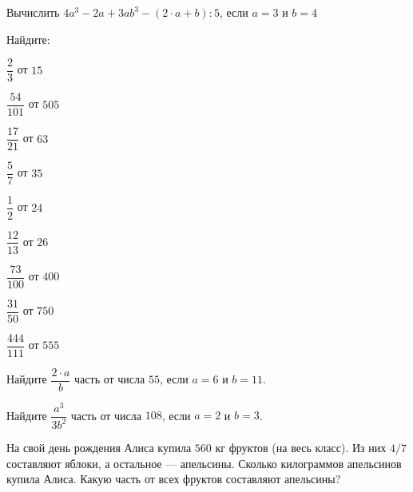 \begin{listofex}
	\item Вычислить \( 4a^3-2a+3ab^3-(2\cdot a+b):5 \), если \( a=3 \) и \( b=4 \)
	\item Найдите:
	\begin{enumcols}[itemcolumns=3]
		\item \( \dfrac{2}{3} \) от \( 15 \)
		\item \( \dfrac{54}{101} \) от \( 505 \)
		\item \( \dfrac{17}{21} \) от \( 63 \)
		\item \( \dfrac{5}{7} \) от \( 35 \)
		\item \( \dfrac{1}{2} \) от \( 24 \)
		\item \( \dfrac{12}{13} \) от \( 26 \)
		\item \( \dfrac{73}{100} \) от \( 400 \)
		\item \( \dfrac{31}{50} \) от \( 750 \)
		\item \( \dfrac{444}{111} \) от \( 555 \)
	\end{enumcols}
	\item Найдите \( \dfrac{2\cdot a}{b} \) часть от числа \( 55 \), если \( a=6 \) и \( b=11 \).
	\item Найдите \( \dfrac{a^3}{3b^2} \) часть от числа \( 108 \), если \( a=2 \) и \( b=3 \).
	\item На свой день рождения Алиса купила \( 560 \) кг фруктов (на весь класс). Из них \( 4/7 \) составляют яблоки, а остальное --- апельсины. Сколько килограммов апельсинов купила Алиса. Какую часть от всех фруктов составляют апельсины?
	
\end{listofex}
